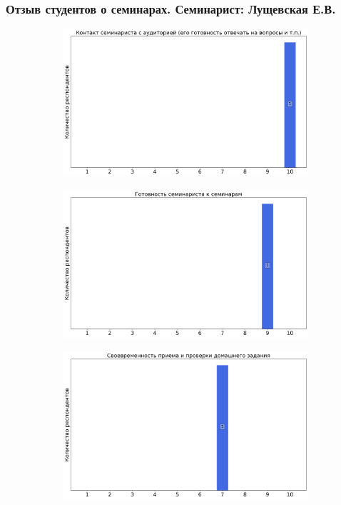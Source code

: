     \subsubsection{Отзыв студентов о семинарах. Семинарист: Лущевская Е.В.}
		\begin{figure}[H]
			\centering
			\begin{subfigure}[b]{0.45\textwidth}
				\centering
				\includegraphics[width=\textwidth]{images/4 course/Квантовая механика/seminarists-marks-Лущевская Е.В.-0.png}
			\end{subfigure}
			\begin{subfigure}[b]{0.45\textwidth}
				\centering
				\includegraphics[width=\textwidth]{images/4 course/Квантовая механика/seminarists-marks-Лущевская Е.В.-1.png}
			\end{subfigure}
			\begin{subfigure}[b]{0.45\textwidth}
				\centering
				\includegraphics[width=\textwidth]{images/4 course/Квантовая механика/seminarists-marks-Лущевская Е.В.-2.png}

\end{subfigure}
\end{figure}
